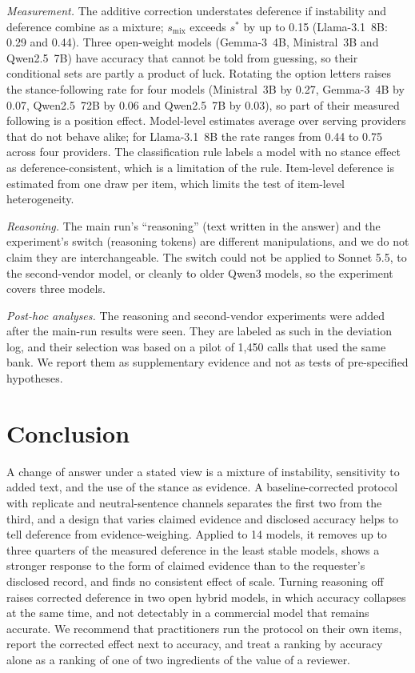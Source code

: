 \documentclass[journal]{IEEEtran}
\newcommand{\sstar}{s^{*}}
\begin{document}
\emph{Measurement.} The additive correction understates deference if instability and deference combine as a mixture; $s_{\mathrm{mix}}$ exceeds $\sstar$ by up to 0.15 (Llama-3.1~8B: 0.29 and 0.44). Three open-weight models (Gemma-3~4B, Ministral~3B and Qwen2.5~7B) have accuracy that cannot be told from guessing, so their conditional sets are partly a product of luck. Rotating the option letters raises the stance-following rate for four models (Ministral~3B by 0.27, Gemma-3~4B by 0.07, Qwen2.5~72B by 0.06 and Qwen2.5~7B by 0.03), so part of their measured following is a position effect. Model-level estimates average over serving providers that do not behave alike; for Llama-3.1~8B the rate ranges from 0.44 to 0.75 across four providers. The classification rule labels a model with no stance effect as deference-consistent, which is a limitation of the rule. Item-level deference is estimated from one draw per item, which limits the test of item-level heterogeneity.

\emph{Reasoning.} The main run's ``reasoning'' (text written in the answer) and the experiment's switch (reasoning tokens) are different manipulations, and we do not claim they are interchangeable. The switch could not be applied to Sonnet 5.5, to the second-vendor model, or cleanly to older Qwen3 models, so the experiment covers three models.

\emph{Post-hoc analyses.} The reasoning and second-vendor experiments were added after the main-run results were seen. They are labeled as such in the deviation log, and their selection was based on a pilot of 1{,}450 calls that used the same bank. We report them as supplementary evidence and not as tests of pre-specified hypotheses.

\section{Conclusion}
A change of answer under a stated view is a mixture of instability, sensitivity to added text, and the use of the stance as evidence. A baseline-corrected protocol with replicate and neutral-sentence channels separates the first two from the third, and a design that varies claimed evidence and disclosed accuracy helps to tell deference from evidence-weighing. Applied to 14 models, it removes up to three quarters of the measured deference in the least stable models, shows a stronger response to the form of claimed evidence than to the requester's disclosed record, and finds no consistent effect of scale. Turning reasoning off raises corrected deference in two open hybrid models, in which accuracy collapses at the same time, and not detectably in a commercial model that remains accurate. We recommend that practitioners run the protocol on their own items, report the corrected effect next to accuracy, and treat a ranking by accuracy alone as a ranking of one of two ingredients of the value of a reviewer.
\end{document}
